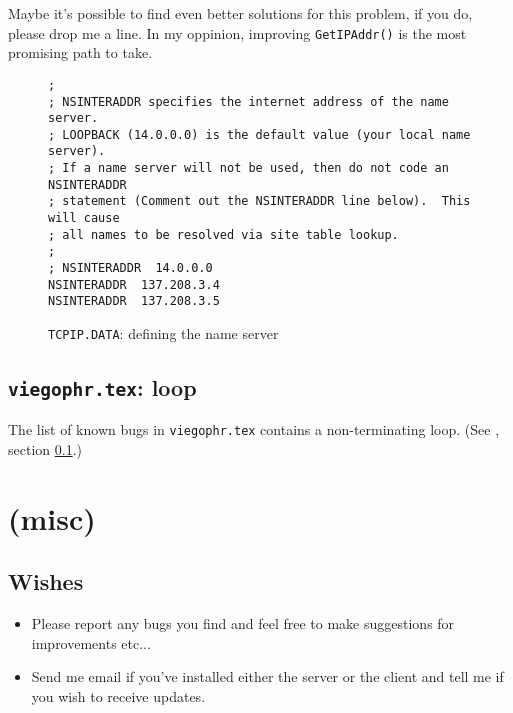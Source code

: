   Maybe it's possible to find even better solutions for this problem,
  if you do, please drop me a line.  In my oppinion, improving
  {\tt GetIPAddr()} is the most promising path to take.
 


\begin{figure}
\caption{{\tt TCPIP.DATA}: defining the name server}\label{fix3}
\rule{0mm}{2mm}
\begin{center}
\begin{small}
\begin{verbatim}
;
; NSINTERADDR specifies the internet address of the name server.
; LOOPBACK (14.0.0.0) is the default value (your local name server).
; If a name server will not be used, then do not code an NSINTERADDR
; statement (Comment out the NSINTERADDR line below).  This will cause
; all names to be resolved via site table lookup.
;
; NSINTERADDR  14.0.0.0
NSINTERADDR  137.208.3.4
NSINTERADDR  137.208.3.5
\end{verbatim}
\end{small}
\end{center}
\rule{0mm}{2mm}
\end{figure}



\subsection{{\tt viegophr.tex}: loop}\label{viegophr.bug}
  The list of known bugs in {\tt viegophr.tex} contains a
  non-terminating loop.
  (See \cite{viegophr.tex}, section \ref{viegophr.bug}.)



\section{(misc)}
 


\subsection{Wishes}

\begin{itemize}
\item Please report any bugs you find and feel free to make
    suggestions for improvements etc...

\item Send me email if you've installed either the server or the client
    and tell me if you wish to receive updates.

\end{itemize}





